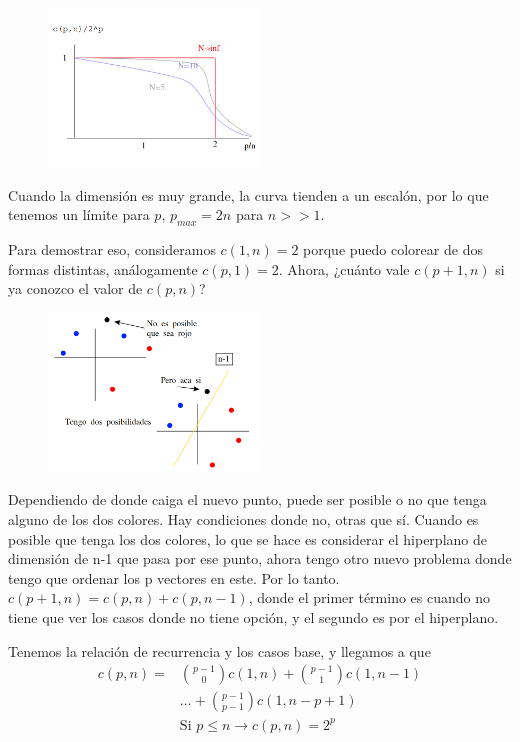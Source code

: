 \begin{figure}[htbp]
	\centering
	\includegraphics[width=0.5\textwidth]{5-2.png}
\end{figure}

Cuando la dimensión es muy grande, la curva tienden a un escalón, por lo que tenemos un límite para $p$, $p_{max}= 2n$ para $n>>1$.

Para demostrar eso, consideramos $c(1,n)=2$ porque puedo colorear de dos formas distintas, análogamente $c(p,1)=2$. Ahora, ¿cuánto vale $c(p+1,n)$ si ya conozco el valor de $c(p,n)$? 

\begin{figure}[H]
	\centering
	\includegraphics[width=0.5\textwidth]{5-3.png}
\end{figure}

Dependiendo de donde caiga el nuevo punto, puede ser posible o no que tenga alguno  de los dos colores. Hay condiciones donde no, otras que sí. Cuando es posible que tenga los dos colores, lo que se hace es considerar el hiperplano de dimensión de n-1 que pasa por ese punto, ahora tengo otro nuevo problema donde tengo que ordenar los p vectores en este. Por lo tanto. $c(p+1, n) = c(p,n) + c(p, n-1)$, donde el primer término es cuando no tiene que ver los casos donde no tiene opción, y el segundo es por el hiperplano.


Tenemos la relación de recurrencia y los casos base, y llegamos a que 
\begin{align}
	c(p,n)=&\binom{p-1}{0}c(1,n) + \binom{p-1}{1}c(1,n-1)\\
	&\dots + \binom{p-1}{p-1}c(1,n-p+1)\\
	&\text{Si } p \le n  \rightarrow c(p,n)=2^p 
\end{align}


